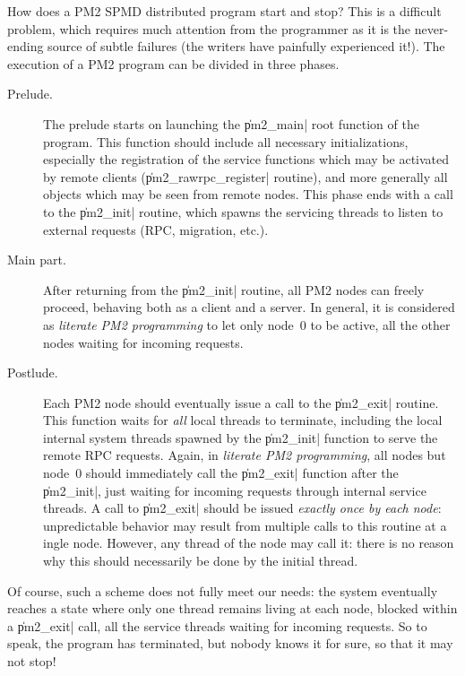 How does a PM2 SPMD distributed program start and stop? This is a
difficult problem, which requires much attention from the programmer
as it is the never-ending source of subtle failures (the writers have
painfully experienced it!). The execution of a PM2 program can be
divided in three phases.
\begin{description}
  
\item[Prelude.] The prelude starts on launching the \|pm2_main| root
  function of the program. This function should include all necessary
  initializations, especially the registration of the service
  functions which may be activated by remote clients
  (\|pm2_rawrpc_register| routine), and more generally all objects
  which may be seen from remote nodes. This phase ends with a call to
  the \|pm2_init| routine, which spawns the servicing threads to
  listen to external requests (RPC, migration, etc.).
  
\item[Main part.] After returning from the \|pm2_init| routine, all
  PM2 nodes can freely proceed, behaving both as a client and a
  server. In general, it is considered as \emph{literate PM2
    programming} to let only node~0 to be active, all the other nodes
  waiting for incoming requests.
  
\item[Postlude.] Each PM2 node should eventually issue a call to the
  \|pm2_exit| routine. This function waits for \emph{all} local
  threads to terminate, including the local internal system threads
  spawned by the \|pm2_init| function to serve the remote RPC
  requests.  Again, in \emph{literate PM2 programming}, all nodes but
  node~0 should immediately call the \|pm2_exit| function after the
  \|pm2_init|, just waiting for incoming requests through internal
  service threads. A call to \|pm2_exit| should be issued
  \emph{exactly once by each node}: unpredictable behavior may result
  from multiple calls to this routine at a ingle node. However, any
  thread of the node may call it: there is no reason why this should
  necessarily be done by the initial thread.

\end{description}
Of course, such a scheme does not fully meet our needs: the system
eventually reaches a state where only one thread remains living at
each node, blocked within a \|pm2_exit| call, all the service threads
waiting for incoming requests. So to speak, the program has
terminated, but nobody knows it for sure, so that it may not stop!
